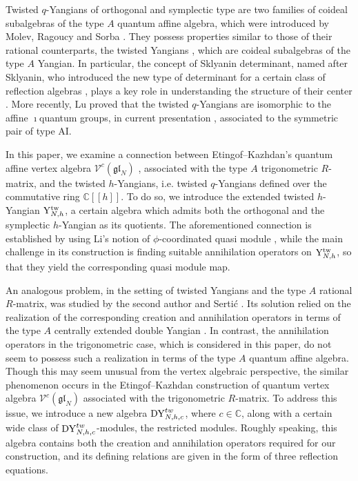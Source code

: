 \documentclass[12pt,a4paper,reqno]{amsart}
\theoremstyle{stil}
\theoremstyle{defi}
\theoremstyle{defi}
\theoremstyle{stil}
\theoremstyle{stil}
\theoremstyle{stil}
\theoremstyle{prim}
\newcommand{\CC}{\mathbb{C}}
\newcommand{\Vcdva}{\mathcal{V}^{c}(\mathfrak{gl}_N)}
\begin{document}
Twisted $q$-Yangians of orthogonal and symplectic type are two families of  coideal subalgebras of the type $A$ quantum affine algebra, which were   introduced by  Molev,   Ragoucy and Sorba \cite{MRS}.
They possess properties similar to those of their rational counterparts, the twisted Yangians \cite{MNO,O}, which are  coideal subalgebras of the type $A$   Yangian. In particular, the concept of Sklyanin determinant,
named  after   Sklyanin, who introduced
 the new type of   determinant  for a certain class of reflection algebras  \cite{Skly},  plays a key role in understanding the structure of their center \cite{MRS,JZ,M1}.
More recently, Lu \cite{Lu} proved that the twisted $q$-Yangians are  isomorphic to the affine  $\imath$quantum groups, in current presentation  \cite{LuWa},  associated to the symmetric pair of type  AI.


In this paper, we examine a connection between Etingof--Kazhdan's quantum affine vertex algebra $\Vcdva$ 
\cite{EK}, associated with the type $A$ trigonometric $R$-matrix, and the twisted $h$-Yangians, i.e. twisted $q$-Yangians    defined over the commutative ring $\CC[[h]]$. To do so, we introduce   
 the extended twisted $h$-Yangian ${\rm Y}_{N,h}^{\text{tw}}$, a certain algebra
which admits both the  orthogonal and the symplectic $h$-Yangian as its quotients.
The aforementioned connection is established by using Li's notion of $\phi$-coordinated quasi module \cite{Liphi}, while the main challenge in its construction is finding suitable annihilation operators on ${\rm Y}_{N,h}^{\text{tw}}$, so that they yield the corresponding quasi module map.

An analogous problem, in the setting of twisted Yangians and the type $A$ rational $R$-matrix, was studied by the second author and Serti\'{c} \cite{KS}.
Its solution relied on the realization of  the corresponding creation and annihilation operators in terms of the type $A$ centrally extended double Yangian \cite{I}. 
In contrast,  the annihilation operators in the trigonometric case, which is considered in this paper,  do not  seem to possess such a  realization in terms of the type $A$ quantum affine algebra.
Though this may seem unusual from the vertex algebraic perspective,  the similar phenomenon occurs in the Etingof--Kazhdan construction of quantum vertex algebra $\Vcdva$ associated with the trigonometric $R$-matrix.
To address this issue, we introduce a  new algebra ${\rm DY}_{N,h,c}^{tw}$, where $c\in\CC$, along with a certain wide class of ${\rm DY}_{N,h,c}^{tw}$-modules, the restricted modules.
Roughly speaking, this algebra contains both the creation and annihilation operators required for our construction,   and its defining relations are given in the form of three reflection equations.
\end{document}
